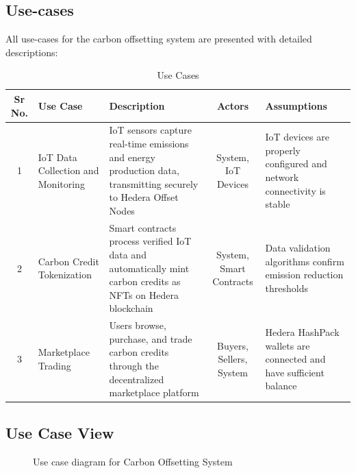 \documentclass[oneside,a4paper,12pt]{book}
\renewcommand{\arraystretch}{1.4}
\begin{document}
\subsection{Use-cases}
All use-cases for the carbon offsetting system are presented with detailed descriptions:

\begin{table}[!htbp]
\begin{center}
\def\arraystretch{1.5}
\begin{tabularx}{\textwidth}{| c | X | X | c | X |}
\hline
Sr No.	& Use Case	& Description	& Actors	& Assumptions \\
\hline
1& IoT Data Collection and Monitoring & IoT sensors capture real-time emissions and energy production data, transmitting securely to Hedera Offset Nodes & System, IoT Devices & IoT devices are properly configured and network connectivity is stable \\
\hline
2& Carbon Credit Tokenization & Smart contracts process verified IoT data and automatically mint carbon credits as NFTs on Hedera blockchain & System, Smart Contracts & Data validation algorithms confirm emission reduction thresholds \\
\hline
3& Marketplace Trading & Users browse, purchase, and trade carbon credits through the decentralized marketplace platform & Buyers, Sellers, System & Hedera HashPack wallets are connected and have sufficient balance \\
\hline
\end{tabularx}
\end{center}
\caption{Use Cases}
\label{tab:usecase}
\end{table}


\newpage
\subsection{Use Case View}
\begin{center}
    \begin{figure}[!htbp]
        \centering
      \caption{Use case diagram for Carbon Offsetting System}
      \label{fig:usecase}
    \end{figure}
\end{center}  
\end{document}
